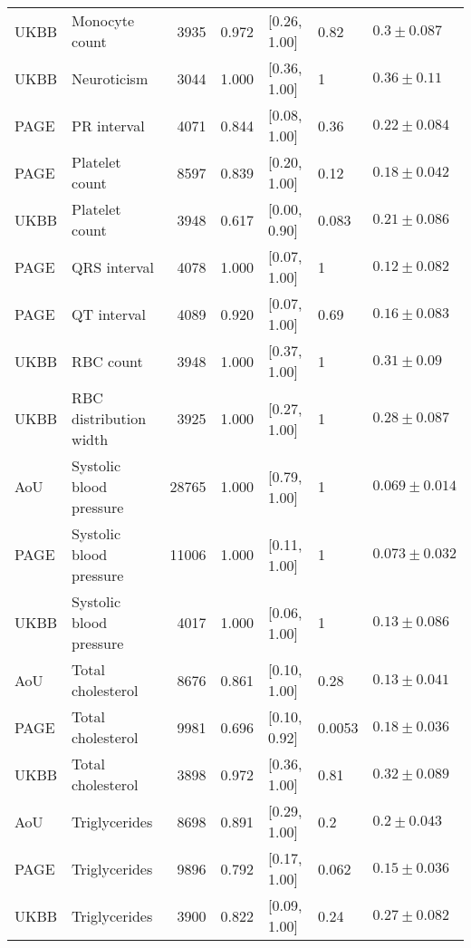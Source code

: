 \begin{tabular}{llrrlll}
 UKBB &           Monocyte count &  3935 & 0.972 &              [0.26, 1.00] &    0.82 &    $0.3 \pm 0.087$ \\
 UKBB &              Neuroticism &  3044 & 1.000 &              [0.36, 1.00] &       1 &    $0.36 \pm 0.11$ \\
 PAGE &              PR interval &  4071 & 0.844 &              [0.08, 1.00] &    0.36 &   $0.22 \pm 0.084$ \\
 PAGE &           Platelet count &  8597 & 0.839 &              [0.20, 1.00] &    0.12 &   $0.18 \pm 0.042$ \\
 UKBB &           Platelet count &  3948 & 0.617 &              [0.00, 0.90] &   0.083 &   $0.21 \pm 0.086$ \\
 PAGE &             QRS interval &  4078 & 1.000 &              [0.07, 1.00] &       1 &   $0.12 \pm 0.082$ \\
 PAGE &              QT interval &  4089 & 0.920 &              [0.07, 1.00] &    0.69 &   $0.16 \pm 0.083$ \\
 UKBB &                RBC count &  3948 & 1.000 &              [0.37, 1.00] &       1 &    $0.31 \pm 0.09$ \\
 UKBB &   RBC distribution width &  3925 & 1.000 &              [0.27, 1.00] &       1 &   $0.28 \pm 0.087$ \\
  AoU &  Systolic blood pressure & 28765 & 1.000 &              [0.79, 1.00] &       1 &  $0.069 \pm 0.014$ \\
 PAGE &  Systolic blood pressure & 11006 & 1.000 &              [0.11, 1.00] &       1 &  $0.073 \pm 0.032$ \\
 UKBB &  Systolic blood pressure &  4017 & 1.000 &              [0.06, 1.00] &       1 &   $0.13 \pm 0.086$ \\
  AoU &        Total cholesterol &  8676 & 0.861 &              [0.10, 1.00] &    0.28 &   $0.13 \pm 0.041$ \\
 PAGE &        Total cholesterol &  9981 & 0.696 &              [0.10, 0.92] &  0.0053 &   $0.18 \pm 0.036$ \\
 UKBB &        Total cholesterol &  3898 & 0.972 &              [0.36, 1.00] &    0.81 &   $0.32 \pm 0.089$ \\
  AoU &            Triglycerides &  8698 & 0.891 &              [0.29, 1.00] &     0.2 &    $0.2 \pm 0.043$ \\
 PAGE &            Triglycerides &  9896 & 0.792 &              [0.17, 1.00] &   0.062 &   $0.15 \pm 0.036$ \\
 UKBB &            Triglycerides &  3900 & 0.822 &              [0.09, 1.00] &    0.24 &   $0.27 \pm 0.082$ \\

\end{tabular}
